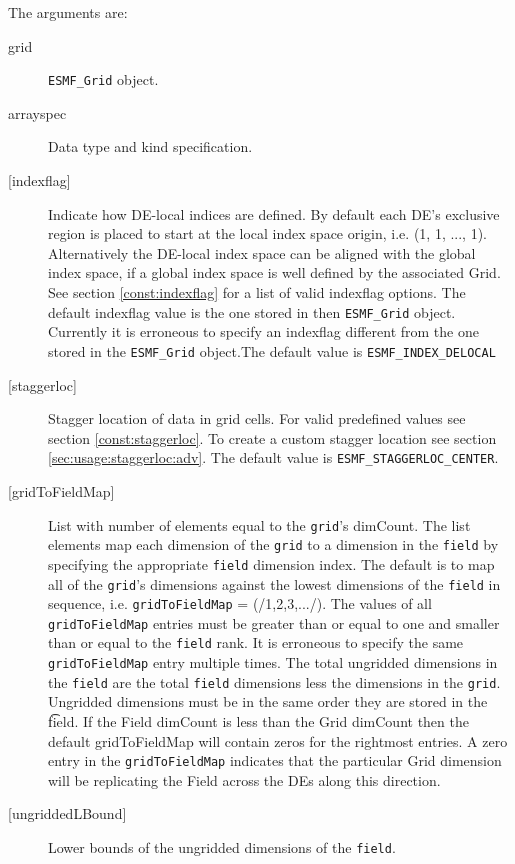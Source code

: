    The arguments are:
   \begin{description}
   \item [grid]
   {\tt ESMF\_Grid} object.
   \item [arrayspec]
   Data type and kind specification.
   \item[{[indexflag]}]
   Indicate how DE-local indices are defined. By default each DE's
   exclusive region is placed to start at the local index space origin,
   i.e. (1, 1, ..., 1). Alternatively the DE-local index space can be
   aligned with the global index space, if a global index space is well
   defined by the associated Grid. See section \ref{const:indexflag}
   for a list of valid indexflag options. The default indexflag value is the
   one stored in then {\tt ESMF\_Grid} object. Currently it is
   erroneous to specify an indexflag
   different from the one stored in the {\tt ESMF\_Grid} object.The default
   value is {\tt ESMF\_INDEX\_DELOCAL}
   \item [{[staggerloc]}]
   Stagger location of data in grid cells. For valid
   predefined values see section \ref{const:staggerloc}.
   To create a custom stagger location see section
   \ref{sec:usage:staggerloc:adv}. The default
   value is {\tt ESMF\_STAGGERLOC\_CENTER}.
   \item [{[gridToFieldMap]}]
   List with number of elements equal to the
   {\tt grid}'s dimCount. The list elements map each dimension
   of the {\tt grid} to a dimension in the {\tt field} by
   specifying the appropriate {\tt field} dimension index. The default is to
   map all of the {\tt grid}'s dimensions against the lowest dimensions of
   the {\tt field} in sequence, i.e. {\tt gridToFieldMap} = (/1,2,3,.../).
   The values of all {\tt gridToFieldMap} entries must be greater than or equal
   to one and smaller than or equal to the {\tt field} rank.
   It is erroneous to specify the same {\tt gridToFieldMap} entry
   multiple times. The total ungridded dimensions in the {\tt field}
   are the total {\tt field} dimensions less
   the dimensions in
   the {\tt grid}. Ungridded dimensions must be in the same order they are
   stored in the {\t field}.
   If the Field dimCount is less than the Grid dimCount then the default
   gridToFieldMap will contain zeros for the rightmost entries. A zero
   entry in the {\tt gridToFieldMap} indicates that the particular
   Grid dimension will be replicating the Field across the DEs along
   this direction.
   \item [{[ungriddedLBound]}]
   Lower bounds of the ungridded dimensions of the {\tt field}.

\end{description}
